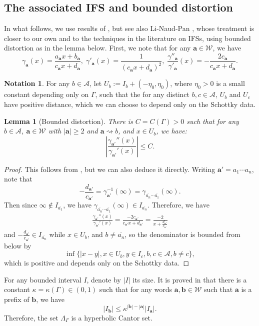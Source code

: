 \documentclass[12pt]{amsart}
\newcommand*\abs[1]{
	\left|#1\right|
}
\newtheorem{lem}{Lemma}[section]
\theoremstyle{definition}
\newtheorem{notation}{Notation}
\renewcommand{\leq}{\leqslant}
\renewcommand{\geq}{\geqslant}
\begin{document}
\subsection{The associated IFS and bounded distortion}In what follows, we use results of \cite{BD}, but see also Li-Naud-Pan \cite{LNP}, whose treatment is closer to our own and to the techniques in the literature on IFSs, using bounded distortion as in the lemma below.
First, we note that for any $\mathbf{a} \in \mathcal{W}$, we have
\[\gamma_\mathbf{a}(x) = \frac{a_\mathbf{a}x + b_\mathbf{a}}{c_\mathbf{a}x + d_\mathbf{a}},\;
\gamma'_\mathbf{a}(x) = \frac{1}{\left(c_\mathbf{a}x + d_\mathbf{a}\right)^2},\;
\frac{\gamma''_\mathbf{a}}{\gamma'_\mathbf{a}}(x) = -\frac{2c_\mathbf{a}}{c_\mathbf{a}x + d_\mathbf{a}}.\]
\begin{notation}
For any $b \in \mathcal{A}$, let $U_b := I_b + (-\eta_0, \eta_0)$, where $\eta_0 > 0$ is a small constant depending only on $\Gamma$, such that the for any distinct $b, c \in \mathcal{A}$, $U_b$ and $U_c$ have positive distance, which we can choose to depend only on the Schottky data.
\end{notation}
\begin{lem}[Bounded distortion]
 There is $C = C(\Gamma)> 0$ such that for any $b \in \mathcal{A}$, $\mathbf{a} \in \mathcal{W}$ with $\abs{\mathbf{a}} \geq 2$ and $\mathbf{a} \rightsquigarrow b$, and $x \in U_b$, we have:
 \[\abs{\frac{\gamma_{\mathbf{a}'}''(x)}{\gamma_{\mathbf{a}'}'(x)}} \leq C.\]
 \label{lem:bounded-distortion}
\end{lem}
\begin{proof}
This follows from \cite[Lemma 2.5]{BD}, but we can also deduce it directly. Writing $\mathbf{a}' = a_1\cdots a_n$, note that
\[-\frac{d_{\mathbf{a}'}}{c_{\mathbf{a}'}} = \gamma_{\mathbf{a}'}^{-1}(\infty) = \gamma_{\overline{a_n}\cdots\overline{a_1}}(\infty).\]
Then since $\infty \notin I_{\overline{a_1}}$, we have $\gamma_{\overline{a_n}\cdots\overline{a_1}}(\infty) \in I_{\overline{a_n}}$.
Therefore, we have
\begin{align*}
\frac{\gamma_{\mathbf{a}'}''(x)}{\gamma_{\mathbf{a}'}'(x)} 
= \frac{-2c_{\mathbf{a}'}}{c_{\mathbf{a}'}x + d_{\mathbf{a}'}}
= \frac{-2}{x  + \frac{d_{\mathbf{a}'}}{c_{\mathbf{a}'}}}
\end{align*}and $-\frac{d_{\mathbf{a}'}}{c_{\mathbf{a}'}} \in I_{\overline{a_{n}}}$ while $x \in U_b$, and $b \neq \overline{a_{n}}$, so the denominator is bounded from below by \[\inf\{\abs{x - y}, x \in U_b, y \in I_c, b, c \in \mathcal{A}, b\neq c\},\]which is positive and depends only on the Schottky data.
\end{proof}
For any bounded interval $I$, denote by $\abs{I}$ its size. It is proved in \cite{BD} that there is a constant $\kappa = \kappa(\Gamma) \in (0,1)$ such that for any words $\mathbf{a},\mathbf{b} \in\mathcal{W}$ such that $\mathbf{a}$ is a prefix of $\mathbf{b}$, we have
\begin{equation}\label{eq:contraction}\abs{I_\mathbf{b}} \leq \kappa^{\abs{\mathbf{b}}-\abs{\mathbf{a}}}\abs{I_\mathbf{a}}.\end{equation}
Therefore, the set $\Lambda_\Gamma$ is a hyperbolic Cantor set.
\end{document}
